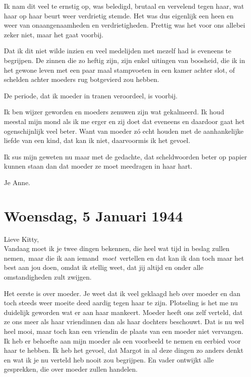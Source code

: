 \documentclass{book}
\begin{document}
Ik nam dit veel te ernstig op, was beledigd, brutaal en vervelend tegen haar,
wat haar op haar beurt weer verdrietig stemde. Het was dus eigenlijk een heen en
weer van onaangenaamheden en verdrietigheden.  Prettig was het voor ons allebei
zeker niet, maar het gaat voorbij.

Dat ik dit niet wilde inzien en veel medelijden met mezelf had is eveneens te
begrijpen. De zinnen die zo heftig zijn, zijn enkel uitingen van boosheid, die
ik in het gewone leven met een paar maal stampvoeten in een kamer achter slot,
of schelden achter moeders rug botgevierd zou hebben.

De periode, dat ik moeder in tranen veroordeel, is voorbij.

Ik ben wijzer geworden en moeders zenuwen zijn wat gekalmeerd. Ik houd meestal
mijn mond als ik me erger en zij doet dat eveneens en daardoor gaat het
ogenschijnlijk veel beter. Want van moeder zó echt houden met de aanhankelijke
liefde van een kind, dat kan ik niet, daarvoormis ik het gevoel.

Ik sus mijn geweten nu maar met de gedachte, dat scheldwoorden beter op papier
kunnen staan dan dat moeder ze moet meedragen in haar hart.

Je Anne.

\section*{Woensdag, 5 Januari 1944}

Lieve Kitty,\\
Vandaag moet ik je twee dingen bekennen, die heel wat tijd in
beslag zullen nemen,~maar die ik aan iemand~\emph{moet}~vertellen en dat kan ik
dan toch maar het best aan jou doen, omdat ik stellig weet, dat jij altijd en
onder alle omstandigheden zult zwijgen.

Het eerste is over moeder. Je weet dat ik veel geklaagd heb over moeder en dan
toch steeds weer moeite deed aardig tegen haar te zijn.  Plotseling is het me nu
duidelijk geworden wat er aan haar mankeert.  Moeder heeft ons zelf verteld, dat
ze ons meer als haar vriendinnen dan als haar dochters beschouwt. Dat is nu wel
heel mooi, maar toch kan een vriendin de plaats van een moeder niet vervangen.
Ik heb er behoefte aan mijn moeder als een voorbeeld te nemen en eerbied voor
haar te hebben.  Ik heb het gevoel, dat Margot in al deze dingen zo anders denkt
en wat ik je nu verteld heb nooit zou begrijpen. En vader ontwijkt alle
gesprekken, die over moeder zullen handelen.
\end{document}
